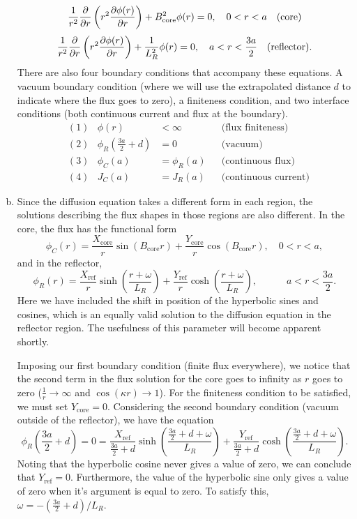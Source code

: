 \begin{enumerate}[a)]
$$ \frac{1}{r^2}\frac{\partial}{\partial r}\left(r^2 \frac{\partial \phi(r)}{\partial r}\right) + B_{\text{core}}^2 \phi(r) = 0, \quad 0 < r < a \quad\text{(core)} $$
$$ \frac{1}{r^2}\frac{\partial}{\partial r}\left(r^2 \frac{\partial \phi(r)}{\partial r}\right) + \frac{1}{L_R^2}\phi(r) = 0, \quad a < r < \frac{3a}{2} \quad\text{(reflector)} .$$
There are also four boundary conditions that accompany these equations. A vacuum boundary condition (where we will use the extrapolated distance $d$ to indicate where the flux goes to zero), a finiteness condition, and two interface conditions (both continuous current and flux at the boundary).
\begin{align*}
&(1)& \phi(r) &< \infty  						& &\text{(flux finiteness)} \\
&(2)& \phi_R\left(\frac{3a}{2} + d\right) &= 0 	& &\text{(vacuum)} \\
&(3)& \phi_C(a) &= \phi_R(a)					& &\text{(continuous flux)} \\
&(4)& J_C(a) &= J_R(a)							& &\text{(continuous current)}
\end{align*}

\item

Since the diffusion equation takes a different form in each region, the solutions describing the flux shapes in those regions are also different. In the core, the flux has the functional form
$$ \phi_C(r) = \frac{X_{\text{core}}}{r} \sin\left(B_{\text{core}} r\right) + \frac{Y_{\text{core}}}{r} \cos\left(B_{\text{core}} r\right) , \quad 0 < r < a,$$
and in the reflector,
$$ \phi_R(r) = \frac{X_{\text{ref}}}{r}\sinh\left(\frac{r+\omega}{L_R}\right) + \frac{Y_{\text{ref}}}{r} \cosh\left(\frac{r+\omega}{L_R}\right), \quad\quad\quad a < r < \frac{3a}{2} .$$
Here we have included the shift in position of the hyperbolic sines and cosines, which is an equally valid solution to the diffusion equation in the reflector region. The usefulness of this parameter will become apparent shortly.

Imposing our first boundary condition (finite flux everywhere), we notice that the second term in the flux solution for the core goes to infinity as $r$ goes to zero ($\frac{1}{r} \rightarrow \infty$ and $\cos(\kappa r) \rightarrow 1$). For the finiteness condition to be satisfied, we must set $Y_{\text{core}} = 0$. Considering the second boundary condition (vacuum outside of the reflector), we have the equation
$$ \phi_R\left(\frac{3a}{2}+d\right) = 0 = \frac{X_{\text{ref}}}{\frac{3a}{2}+d}\sinh\left(\frac{\frac{3a}{2}+d+\omega}{L_R}\right) + \frac{Y_{\text{ref}}}{\frac{3a}{2}+d} \cosh\left(\frac{\frac{3a}{2}+d+\omega}{L_R}\right) .$$
Noting that the hyperbolic cosine never gives a value of zero, we can conclude that $Y_{\text{ref}} = 0$.
Furthermore, the value of the hyperbolic sine only gives a value of zero when it's argument is equal to zero. To satisfy this, $\omega = -\left(\frac{3a}{2}+d\right)/L_R$.


\end{enumerate}
